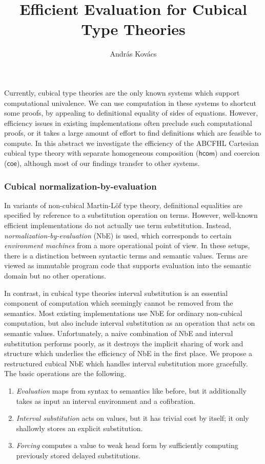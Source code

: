 \documentclass[letterpaper]{easychair}
\title{Efficient Evaluation for Cubical Type Theories
}
\author{
András Kovács
}
\institute{
  Eötvös Loránd University\\
  \email{kovacsandras@inf.elte.hu}
}
\newcommand{\msf}[1]{\mathsf{#1}}
\begin{document}
\maketitle

Currently, cubical type theories are the only known systems which support
computational univalence. We can use computation in these systems to shortcut
some proofs, by appealing to definitional equality of sides of
equations. However, efficiency issues in existing implementations often preclude
such computational proofs, or it takes a large amount of effort to find
definitions which are feasible to compute. In this abstract we investigate the
efficiency of the ABCFHL \cite{abcfhl} Cartesian cubical type theory with
separate homogeneous composition ($\msf{hcom}$) and coercion ($\msf{coe}$),
although most of our findings transfer to other systems.

\subsubsection*{Cubical normalization-by-evaluation}

In variants of non-cubical Martin-Löf type theory, definitional equalities are
specified by reference to a substitution operation on terms. However, well-known
efficient implementations do not actually use term substitution. Instead,
\emph{normalization-by-evaluation} (NbE) is used, which corresponds to certain
\emph{environment machines} from a more operational point of view. In these
setups, there is a distinction between syntactic terms and semantic
values. Terms are viewed as immutable program code that supports evaluation into
the semantic domain but no other operations.

In contrast, in cubical type theories interval substitution is an essential
component of computation which seemingly cannot be removed from the
semantics. Most existing implementations use NbE for ordinary non-cubical
computation, but also include interval substitution as an operation that acts on
semantic values. Unfortunately, a naive combination of NbE and interval
substitution performs poorly, as it destroys the implicit sharing of work
and structure which underlies the efficiency of NbE in the first place. We
propose a restructured cubical NbE which handles interval substitution more
gracefully. The basic operations are the following.

\begin{enumerate}
\item \emph{Evaluation} maps from syntax to semantics like before, but it
  additionally takes as input an interval environment and a cofibration.
\item \emph{Interval substitution} acts on values, but it has trivial cost by itself;
  it only shallowly stores an explicit substitution.
\item \emph{Forcing} computes a value to weak head form by sufficiently computing
  previously stored delayed substitutions.
\end{enumerate}
\end{document}
